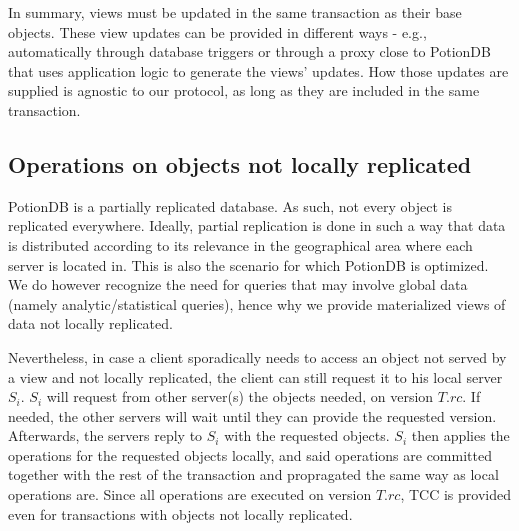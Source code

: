 \documentclass[sigconf, nonacm]{acmart}
\begin{document}
In summary, views must be updated in the same transaction as their base objects.
These view updates can be provided in different ways - e.g., automatically through database triggers \cite{oracleTriggers, dbtoaster} or through a proxy close to PotionDB that uses application logic to generate the views' updates.
How those updates are supplied is agnostic to our protocol, as long as they are included in the same transaction.

\subsection{Operations on objects not locally replicated}
\label{subsec:operationsNonLocal}

PotionDB is a partially replicated database.
As such, not every object is replicated everywhere.
Ideally, partial replication is done in such a way that data is distributed according to its relevance in the geographical area where each server is located in.
This is also the scenario for which PotionDB is optimized.
We do however recognize the need for queries that may involve global data (namely analytic/statistical queries), hence why we provide materialized views of data not locally replicated.

Nevertheless, in case a client sporadically needs to access an object not served by a view and not locally replicated, the client can still request it to his local server $S_i$.
$S_i$ will request from other server(s) the objects needed, on version $T.rc$.
If needed, the other servers will wait until they can provide the requested version.
Afterwards, the servers reply to $S_i$ with the requested objects.
$S_i$ then applies the operations for the requested objects locally, and said operations are committed together with the rest of the transaction and propragated the same way as local operations are.
Since all operations are executed on version $T.rc$, TCC is provided even for transactions with objects not locally replicated.
\end{document}
